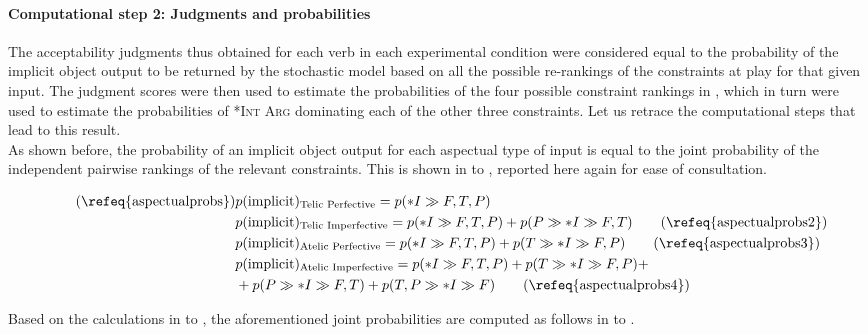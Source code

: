 \paragraph{Computational step 2: Judgments and probabilities} The acceptability judgments thus obtained for each verb in each experimental condition were considered equal to the probability of the implicit object output to be returned by the stochastic model based on all the possible re-rankings of the constraints at play for that given input. The judgment scores were then used to estimate the probabilities of the four possible constraint rankings in , which in turn were used to estimate the probabilities of \textsc{*Int Arg} dominating each of the other three constraints. Let us retrace the computational steps that lead to this result.\\
As shown before, the probability of an implicit object output for each aspectual type of input is equal to the joint probability of the independent pairwise rankings of the relevant constraints. This is shown in  to , reported here again for ease of consultation.

\begin{align*}  \tag{\refeq{aspectualprobs}}
    & p(\text{implicit})\textsubscript{Telic Perfective} = p(*I \gg {F, T, P}) \\
    & p(\text{implicit})\textsubscript{Telic Imperfective} = p(*I \gg {F, T, P}) + p(P \gg *I \gg {F, T}) \tag{\refeq{aspectualprobs2}}\\
    & p(\text{implicit})\textsubscript{Atelic Perfective} = p(*I \gg {F, T, P}) + p(T \gg *I \gg {F, P}) \tag{\refeq{aspectualprobs3}}\\
    & p(\text{implicit})\textsubscript{Atelic Imperfective} = p(*I \gg {F, T, P}) + p(T \gg *I \gg {F, P}) + \nonumber \\ & + p(P \gg *I \gg {F, T}) + p({T, P} \gg *I \gg F) \tag{\refeq{aspectualprobs4}}
\end{align*}

Based on the calculations in  to , the aforementioned joint probabilities are computed as follows in  to .

